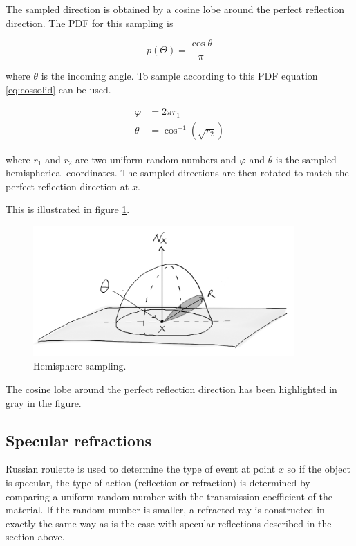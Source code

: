 \documentclass[a4paper]{report}
\begin{document}
The sampled direction is obtained by a cosine lobe around the perfect
reflection direction. The PDF for this sampling is

\begin{equation}
  p(\Theta) = \frac{\cos{\theta}}{\pi}
\end{equation}

where \(\theta\) is the incoming angle. To sample according to this
PDF equation \ref{eq:cossolid} can be used.

\begin{align}
  \varphi &= 2 \pi r_1 \nonumber \\
  \theta &= \cos^{-1}(\sqrt{r_2})
  \label{eq:cossolid}
\end{align}

where \(r_1\) and \(r_2\) are two uniform random numbers and
\(\varphi\) and \(\theta\) is the sampled hemispherical coordinates. The sampled
directions are then rotated to match the perfect reflection direction
at \(x\).

This is illustrated in figure \ref{fig:hemsample}.

\begin{figure}[h]
  \centering
  \includegraphics[width=10cm]{figures/6}
  \caption{Hemisphere sampling.}
  \label{fig:hemsample}
\end{figure}

The cosine lobe around the perfect reflection direction has been highlighted in gray in the figure.

\subsection{Specular refractions}

Russian roulette is used to determine the type of event at point \(x\)
so if the object is specular, the type of action (reflection or
refraction) is determined by comparing a uniform random number with
the transmission coefficient of the material. If the random number is
smaller, a refracted ray is constructed in exactly the same way as is
the case with specular reflections described in the section above.
\end{document}
